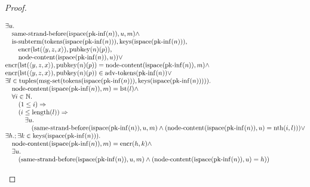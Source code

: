 \documentclass[11pt]{article}
\theoremstyle{plain}
\begin{document}
\begin{proof}
\begin{itemize}[leftmargin=2.8em, itemsep=4pt, parsep=1pt]
\begin{itemize}[leftmargin=2.8em, itemsep=4pt, parsep=1pt]
\begin{equation*}
\begin{array}{@{}l@{}} \exists u. \\ \quad \operatorname{same\text{-}strand\text{-}before}(\operatorname{ispace}(\operatorname{pk\text{-}inf}(n)), u, m) \wedge \\ \quad \operatorname{is\text{-}subterm}(\operatorname{tokens}(\operatorname{ispace}(\operatorname{pk\text{-}inf}(n))), \operatorname{keys}(\operatorname{ispace}(\operatorname{pk\text{-}inf}(n))), \\ \quad \quad \operatorname{encr}(\operatorname{lst}(\langle y, z, x \rangle), \operatorname{pubkey}(n)(p)), \\ \quad \quad \operatorname{node\text{-}content}(\operatorname{ispace}(\operatorname{pk\text{-}inf}(n)), u)) \vee \\ \operatorname{encr}(\operatorname{lst}(\langle y, z, x \rangle), \operatorname{pubkey}(n)(p)) = \operatorname{node\text{-}content}(\operatorname{ispace}(\operatorname{pk\text{-}inf}(n)), m) \wedge \\ \operatorname{encr}(\operatorname{lst}(\langle y, z, x \rangle), \operatorname{pubkey}(n)(p)) \in \operatorname{adv\text{-}tokens}(\operatorname{pk\text{-}inf}(n)) \vee \\ \exists l \in \operatorname{tuples}(\operatorname{msg\text{-}set}(\operatorname{tokens}(\operatorname{ispace}(\operatorname{pk\text{-}inf}(n))), \operatorname{keys}(\operatorname{ispace}(\operatorname{pk\text{-}inf}(n))))). \\ \quad \operatorname{node\text{-}content}(\operatorname{ispace}(\operatorname{pk\text{-}inf}(n)), m) = \operatorname{lst}(l) \wedge \\ \quad \forall i \in \mathbb{N}. \\ \quad \quad (1 \leq i) \Rightarrow  \\ \quad \quad (i \leq \operatorname{length}(l)) \Rightarrow  \\ \quad \quad \quad \exists u. \\ \quad \quad \quad \quad (\operatorname{same\text{-}strand\text{-}before}(\operatorname{ispace}(\operatorname{pk\text{-}inf}(n)), u, m) \wedge (\operatorname{node\text{-}content}(\operatorname{ispace}(\operatorname{pk\text{-}inf}(n)), u) = \operatorname{nth}(i, l))) \vee \\ \exists h.; \exists k \in \operatorname{keys}(\operatorname{ispace}(\operatorname{pk\text{-}inf}(n))). \\ \quad \operatorname{node\text{-}content}(\operatorname{ispace}(\operatorname{pk\text{-}inf}(n)), m) = \operatorname{encr}(h, k) \wedge \\ \quad \exists u. \\ \quad \quad (\operatorname{same\text{-}strand\text{-}before}(\operatorname{ispace}(\operatorname{pk\text{-}inf}(n)), u, m) \wedge (\operatorname{node\text{-}content}(\operatorname{ispace}(\operatorname{pk\text{-}inf}(n)), u) = h)) \end{array}
\end{equation*}


\end{itemize}
\end{itemize}
\end{proof}
\end{document}
